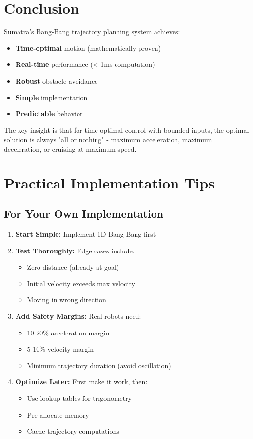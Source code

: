 \documentclass[12pt,a4paper]{article}
\begin{document}
\section{Conclusion}

Sumatra's Bang-Bang trajectory planning system achieves:
\begin{itemize}
    \item \textbf{Time-optimal} motion (mathematically proven)
    \item \textbf{Real-time} performance (< 1ms computation)
    \item \textbf{Robust} obstacle avoidance
    \item \textbf{Simple} implementation
    \item \textbf{Predictable} behavior
\end{itemize}

The key insight is that for time-optimal control with bounded inputs, the optimal solution is always "all or nothing" - maximum acceleration, maximum deceleration, or cruising at maximum speed.

\section{Practical Implementation Tips}

\subsection{For Your Own Implementation}

\begin{enumerate}
    \item \textbf{Start Simple:} Implement 1D Bang-Bang first
    \item \textbf{Test Thoroughly:} Edge cases include:
    \begin{itemize}
        \item Zero distance (already at goal)
        \item Initial velocity exceeds max velocity
        \item Moving in wrong direction
    \end{itemize}
    \item \textbf{Add Safety Margins:} Real robots need:
    \begin{itemize}
        \item 10-20\% acceleration margin
        \item 5-10\% velocity margin
        \item Minimum trajectory duration (avoid oscillation)
    \end{itemize}
    \item \textbf{Optimize Later:} First make it work, then:
    \begin{itemize}
        \item Use lookup tables for trigonometry
        \item Pre-allocate memory
        \item Cache trajectory computations
    \end{itemize}
\end{enumerate}
\end{document}
